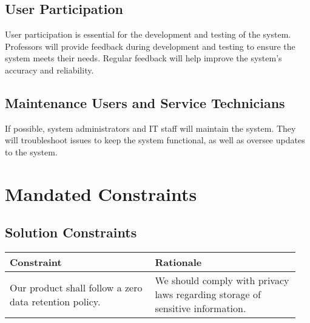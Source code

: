 \documentclass[12pt]{article}
\begin{document}
\subsection{User Participation}
User participation is essential for the development and testing of the system.
Professors will provide feedback during development and testing to ensure the
system meets their needs. Regular feedback will help improve the system's
accuracy and reliability.

\subsection{Maintenance Users and Service Technicians}
If possible, system administrators and IT staff will maintain the system. They
will troubleshoot issues to keep the system functional, as well as oversee
updates to the system.


\section{Mandated Constraints}
\subsection{Solution Constraints}
\begin{table}[h!]
    \centering
    \begin{tabular}{| p{0.475\linewidth} | p{0.475\linewidth} |}
    \hline
    \textbf{Constraint}   & \textbf{Rationale} \\
    \hline
    Our product shall follow a zero data retention policy. &
    We should comply with privacy laws regarding storage of sensitive information. \\
    \hline
    \end{tabular}
\end{table}
\end{document}
